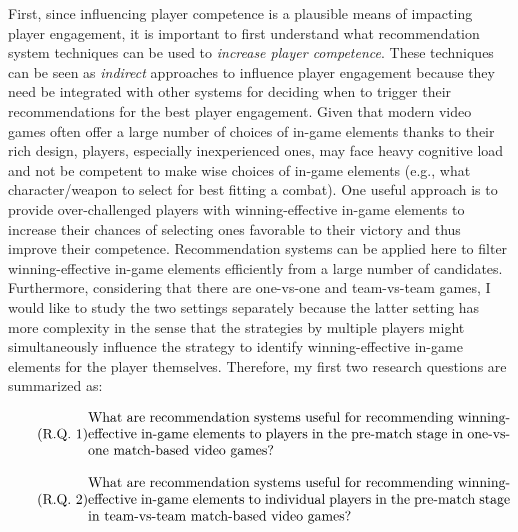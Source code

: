 First, since influencing player competence is a plausible means of impacting player engagement, it is important to first understand what recommendation system techniques can be used to \textit{increase player competence}. These techniques can be seen as \textit{indirect} approaches to influence player engagement because they need be integrated with other systems for deciding when to trigger their recommendations for the best player engagement. Given that modern video games often offer a large number of choices of in-game elements thanks to their rich design, players, especially inexperienced ones, may face heavy cognitive load and not be competent to make wise choices of in-game elements (e.g., what character/weapon to select for best fitting a combat). One useful approach is to provide over-challenged players with winning-effective in-game elements to increase their chances of selecting ones favorable to their victory and thus improve their competence. Recommendation systems can be applied here to filter winning-effective in-game elements efficiently from a large number of candidates. Furthermore, considering that there are one-vs-one and team-vs-team games, I would like to study the two settings separately because the latter setting has more complexity in the sense that the strategies by multiple players might simultaneously influence the strategy to identify winning-effective in-game elements for the player themselves. Therefore, my first two research questions are summarized as: 

\begin{equation}
  \tag{R.Q. 1}\label{rq1}
  \parbox{\dimexpr\linewidth-4em}{%
    \strut
    What are recommendation systems useful for recommending winning-effective in-game elements to players in the pre-match stage in one-vs-one match-based video games?
    \strut
  }
\end{equation}


\begin{equation}
  \tag{R.Q. 2}\label{rq2}
  \parbox{\dimexpr\linewidth-4em}{%
    \strut
What are recommendation systems useful for recommending winning-effective in-game elements to individual players in the pre-match stage in team-vs-team match-based video games?
    \strut
  }
\end{equation}



